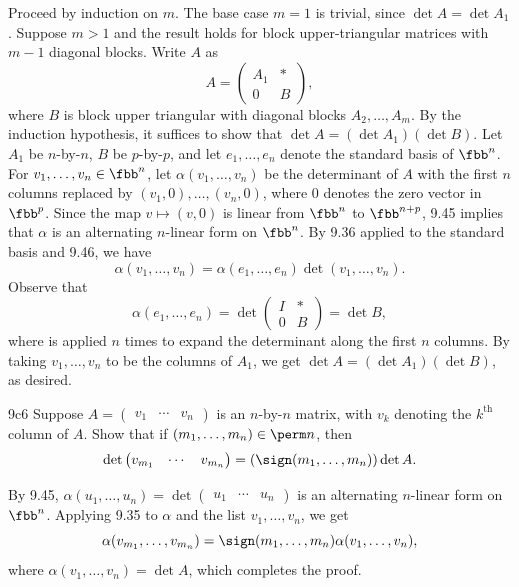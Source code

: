 \begin{sol}
    Proceed by induction on $m$.
    The base case $m = 1$ is trivial, since $\det A = \det A_1$.
    Suppose $m > 1$ and the result holds for block upper-triangular matrices with $m-1$ diagonal blocks.
    Write $A$ as
    \[
        A = 
        \begin{pmatrix}
            A_1 & * \\
            0 & B
        \end{pmatrix},
    \]
    where $B$ is block upper triangular with diagonal blocks $A_2, \ldots, A_m$.
    By the induction hypothesis, it suffices to show that $\det A = (\det A_1)(\det B)$.
    Let $A_1$ be $n$-by-$n$, $B$ be $p$-by-$p$, and let $e_1, \ldots, e_n$ denote the standard basis of $\fbb^n$.
    For $v_1, \ldots, v_n \in \fbb^n$, let $\alpha(v_1, \ldots, v_n)$ be the determinant of $A$ with the first $n$ columns replaced by $(v_1, 0), \ldots, (v_n, 0)$, where $0$ denotes the zero vector in $\fbb^p$.
    Since the map $v \mapsto (v, 0)$ is linear from $\fbb^n$ to $\fbb^{n+p}$, 9.45 implies that $\alpha$ is an alternating $n$-linear form on $\fbb^n$.
    By 9.36 applied to the standard basis and 9.46, we have
    \[
        \alpha(v_1, \ldots, v_n) = \alpha(e_1, \ldots, e_n) \det(v_1, \ldots, v_n).
    \] 
    Observe that
    \[
        \alpha(e_1, \ldots, e_n) = \det
        \begin{pmatrix}
            I & * \\
            0 & B
        \end{pmatrix}
        = \det B,
    \]
    where  is applied $n$ times to expand the determinant along the first $n$ columns.
    By taking $v_1, \ldots, v_n$ to be the columns of $A_1$, we get $\det A = (\det A_1)(\det B)$, as desired.
\end{sol}

\begin{exercise}{9c6}
    Suppose $A = \begin{pmatrix} v_1 & \cdots & v_n \end{pmatrix}$ is an $n$-by-$n$ matrix, with $v_k$ denoting the $k^{\text{th}}$ column of $A$.
    Show that if $(m_1, \ldots, m_n) \in \perm n$, then
    \[
        \det \begin{pmatrix} v_{m_1} & \cdots & v_{m_n} \end{pmatrix} = (\sign(m_1, \ldots, m_n)) \det A.
    \]
\end{exercise}

\begin{sol}
    By 9.45, $\alpha(u_1, \ldots, u_n) = \det \begin{pmatrix} u_1 & \cdots & u_n \end{pmatrix}$ is an alternating $n$-linear form on $\fbb^n$.
    Applying 9.35 to $\alpha$ and the list $v_1, \ldots, v_n$, we get
    \[
        \alpha(v_{m_1}, \ldots, v_{m_n}) = \sign(m_1, \ldots, m_n) \alpha(v_1, \ldots, v_n),
    \]
    where $\alpha(v_1, \ldots, v_n) = \det A$, which completes the proof.
\end{sol}


